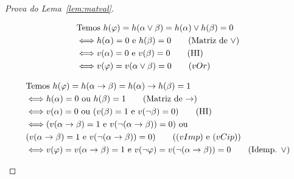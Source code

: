 \begin{proof}[Prova do Lema~\ref{lem:matval}]
\begin{provaporcasos}
\begin{provaporsubcasos}
                    \begin{align*}
                        &\textnormal{Temos }h(\phi) = h(\alpha \lor \beta) = h(\alpha) \lor h(\beta) = 0\\
                        &\Longleftrightarrow h(\alpha) = 0\textnormal{ e }h(\beta) = 0\tag*{(Matriz de $\lor$)}\\
                        &\Longleftrightarrow v(\alpha) = 0\textnormal{ e }v(\beta) = 0\tag*{(HI)}\\
                        &\Longleftrightarrow v(\phi) = v(\alpha \lor \beta) = 0\tag*{$(vOr)$}
                    \end{align*}

            \end{provaporsubcasos}


            \begin{provaporsubcasos}
                    \begin{align*}
                        &\textnormal{Temos }h(\phi) = h(\alpha \to \beta) = h(\alpha) \to h(\beta) = 1\\
                        &\Longleftrightarrow h(\alpha) = 0\textnormal{ ou } h(\beta) = 1\tag*{(Matriz de $\to$)}\\
                        &\Longleftrightarrow v(\alpha) = 0\textnormal{ ou } (v(\beta) = 1\textnormal{ e }v(\neg \beta) = 0)\tag*{(HI)}\\
                        &\Longleftrightarrow (v(\alpha \to \beta) = 1\textnormal{ e }v(\neg (\alpha \to \beta)) = 0)\textnormal{ ou }\\& (v(\alpha \to \beta) = 1\textnormal{ e }v(\neg (\alpha \to \beta)) = 0)\tag*{($(vImp)$ e $(vCip)$)}\\
                        &\Longleftrightarrow v(\phi) = v(\alpha \to \beta) = 1\textnormal{ e }v(\neg \phi) = v(\neg (\alpha \to \beta)) = 0\tag*{(Idemp. $\lor$)}
                    \end{align*}
                        

\end{provaporsubcasos}
\end{provaporcasos}
\end{proof}
